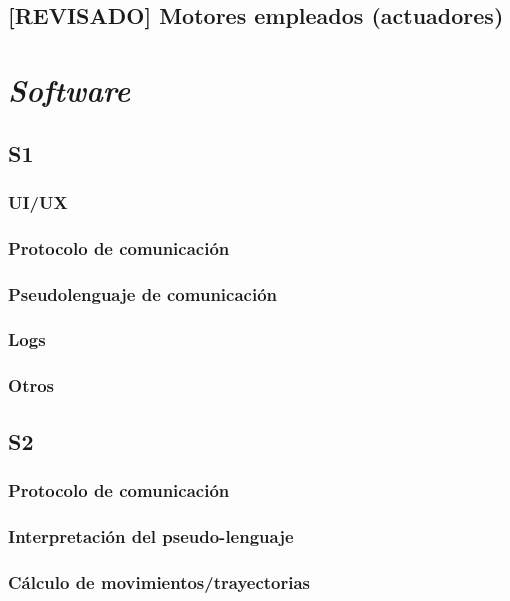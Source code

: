 \section{[REVISADO] Motores empleados (actuadores)}


\chapter{\textit{Software}}
\label{chap:software}

\section{S1}

\subsection{UI/UX}

\subsection{Protocolo de comunicación}

\subsection{Pseudolenguaje de comunicación}

\subsection{Logs}

\subsection{Otros}

\section{S2}

\subsection{Protocolo de comunicación}

\subsection{Interpretación del pseudo-lenguaje}

\subsection{Cálculo de movimientos/trayectorias}

